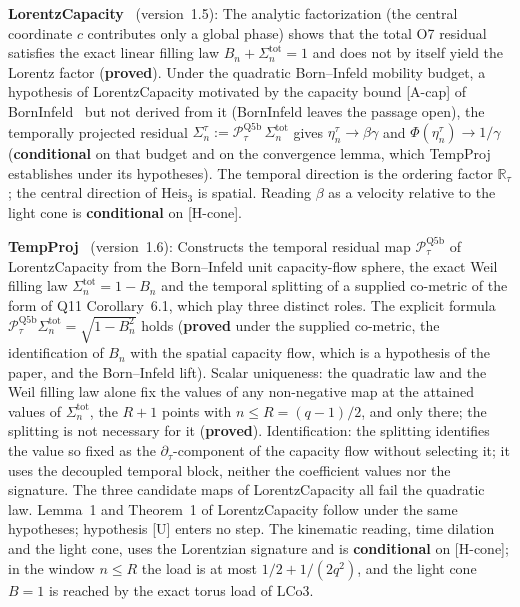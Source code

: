 \documentclass[11pt,a4paper]{article}
\newcommand{\sproved}{\textcolor{cproved}{\textbf{proved}}}
\newcommand{\scond}{\textcolor{ccond}{\textbf{conditional}}}
\begin{document}
    \textbf{LorentzCapacity}~\cite{Beau2026n} (version~1.5): The analytic factorization (the central coordinate $c$
    contributes only a global phase) shows that the total O7 residual satisfies the exact linear filling law
    $B_n + \Sigma_n^{\mathrm{tot}} = 1$ and does not by itself yield the Lorentz factor (\sproved).
    Under the quadratic Born--Infeld mobility budget, a hypothesis of LorentzCapacity motivated by the capacity bound
    [A-cap] of BornInfeld~\cite{Beau2026c} but not derived from it (BornInfeld leaves the passage open), the
    temporally projected residual $\Sigma_n^\tau := \mathcal{P}_\tau^{\mathrm{Q5b}}\,\Sigma_n^{\mathrm{tot}}$
    gives $\eta_n^\tau \to \beta\gamma$ and $\Phi(\eta_n^\tau) \to 1/\gamma$ (\scond{} on that budget and on the
    convergence lemma, which TempProj~\cite{Beau2026tp} establishes under its hypotheses).
    The temporal direction is the ordering factor $\mathbb{R}_\tau$; the central direction of
    $\mathrm{Heis}_3$ is spatial. Reading $\beta$ as a velocity relative to the light cone is \scond{} on
    [H-cone].

    \textbf{TempProj}~\cite{Beau2026tp} (version~1.6): Constructs the temporal residual map
    $\mathcal{P}_\tau^{\mathrm{Q5b}}$ of LorentzCapacity from the Born--Infeld unit capacity-flow sphere, the exact
    Weil filling law $\Sigma_n^{\mathrm{tot}} = 1 - B_n$ and the temporal splitting of a supplied co-metric of the
    form of Q11 Corollary~6.1, which play three distinct roles.
    The explicit formula $\mathcal{P}_\tau^{\mathrm{Q5b}}\Sigma_n^{\mathrm{tot}} = \sqrt{1-B_n^2}$ holds
    (\sproved{} under the supplied co-metric, the identification of $B_n$ with the spatial capacity flow, which is
    a hypothesis of the paper, and the Born--Infeld lift).
    Scalar uniqueness: the quadratic law and the Weil filling law alone fix the values of any non-negative map at
    the attained values of $\Sigma_n^{\mathrm{tot}}$, the $R+1$ points with $n \le R = (q-1)/2$, and only there; the
    splitting is not necessary for it (\sproved).
    Identification: the splitting identifies the value so fixed as the $\partial_\tau$-component of the capacity
    flow without selecting it; it uses the decoupled temporal block, neither the coefficient values nor the
    signature.
    The three candidate maps of LorentzCapacity all fail the quadratic law.
    Lemma~1 and Theorem~1 of LorentzCapacity follow under the same hypotheses; hypothesis [U] enters no step.
    The kinematic reading, time dilation and the light cone, uses the Lorentzian signature and is \scond{} on
    [H-cone]; in the window $n \le R$ the load is at most $1/2 + 1/(2q^2)$, and the light cone $B = 1$ is reached
    by the exact torus load of LCo3.
\end{document}
